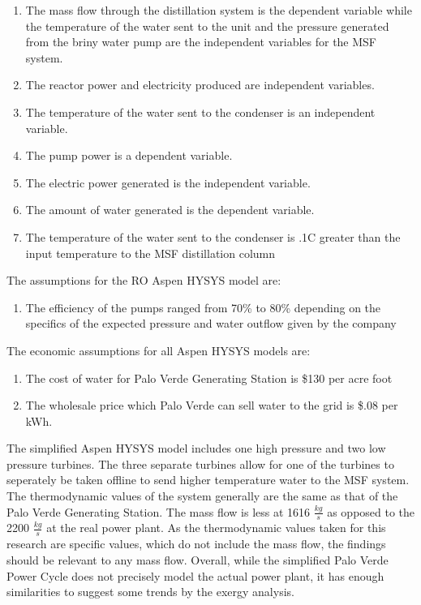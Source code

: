 \documentclass[12pt]{UIdahoMastersThesis}
\begin{document}
\begin{enumerate}
\item The mass flow through the distillation system is the dependent variable while the temperature of the water sent to the unit and the pressure generated from the briny water pump are the independent variables for the MSF system.
\item The reactor power and electricity produced are independent variables.
\item The temperature of the water sent to the condenser is an independent variable.
\item The pump power is a dependent variable.
\item The electric power generated is the independent variable.
\item The amount of water generated is the dependent variable.
\item The temperature of the water sent to the condenser is .1\degree C greater than the input temperature to the MSF distillation column
\end{enumerate}

The assumptions for the RO Aspen HYSYS model are:

\begin{enumerate}
\item The efficiency of the pumps ranged from 70\% to 80\% depending on the specifics of the expected pressure and water outflow given by the company 
\end{enumerate}

The economic assumptions for all Aspen HYSYS models are:
\begin{enumerate}
\item The cost of water for Palo Verde Generating Station is \$130 per acre foot \cite{Brown2018}
\item The wholesale price which Palo Verde can sell water to the grid is \$.08 per kWh.
\end{enumerate}

The simplified Aspen HYSYS model includes one high pressure and two low pressure turbines.  The three separate turbines allow for one of the turbines to seperately be taken offline to send higher temperature water to the MSF system. The thermodynamic values of the system generally are the same as that of the Palo Verde Generating Station.  The mass flow is less at 1616 $\frac{kg}{s}$ as opposed to the 2200 $\frac{kg}{s}$ at the real power plant. As the thermodynamic values taken for this research are specific values, which do not include the mass flow, the findings should be relevant to any mass flow. Overall, while the simplified Palo Verde Power Cycle does not precisely model the actual power plant, it has enough similarities to suggest some trends by the exergy analysis.
\end{document}
